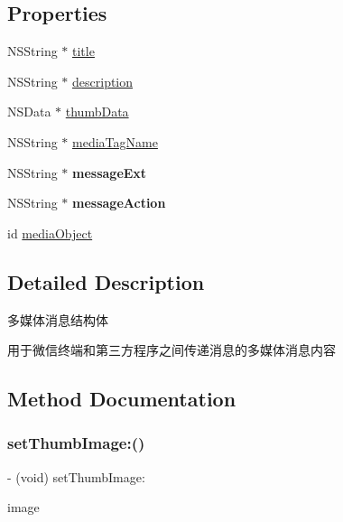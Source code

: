 \subsection*{Properties}
\begin{DoxyCompactItemize}
\item 
N\+S\+String $\ast$ \mbox{\hyperlink{interface_w_x_media_message_ad2fe805228158ccc9c926f4708f496f5}{title}}
\item 
N\+S\+String $\ast$ \mbox{\hyperlink{interface_w_x_media_message_a9e5598848cfeb2f6bfb3a39146cf9bd9}{description}}
\item 
N\+S\+Data $\ast$ \mbox{\hyperlink{interface_w_x_media_message_a1dcd0ea41ad61fe428df6dcf2a206fcb}{thumb\+Data}}
\item 
N\+S\+String $\ast$ \mbox{\hyperlink{interface_w_x_media_message_ad4f92763eda6e8ac206df0ce32124edc}{media\+Tag\+Name}}
\item 
\mbox{\label{interface_w_x_media_message_ab76e4f34edc459d18411c958f27abf56}} 
N\+S\+String $\ast$ {\bfseries message\+Ext}
\item 
\mbox{\label{interface_w_x_media_message_a00ebb5c6a3ed0293316e5003844f2258}} 
N\+S\+String $\ast$ {\bfseries message\+Action}
\item 
id \mbox{\hyperlink{interface_w_x_media_message_aeb7364bb1fa68bf7c32c00d9c87cdbc5}{media\+Object}}
\end{DoxyCompactItemize}


\subsection{Detailed Description}
多媒体消息结构体 

用于微信终端和第三方程序之间传递消息的多媒体消息内容 

\subsection{Method Documentation}
\mbox{\label{interface_w_x_media_message_ac3dbcbb2f989c4775df5747f9ce18bdf}} 
\subsubsection{\texorpdfstring{set\+Thumb\+Image\+:()}{setThumbImage:()}\hspace{0.1cm}{\footnotesize\ttfamily [1/3]}}
{\footnotesize\ttfamily -\/ (void) set\+Thumb\+Image\+: \begin{DoxyParamCaption}\item[{(U\+I\+Image $\ast$)}]{image }\end{DoxyParamCaption}}



